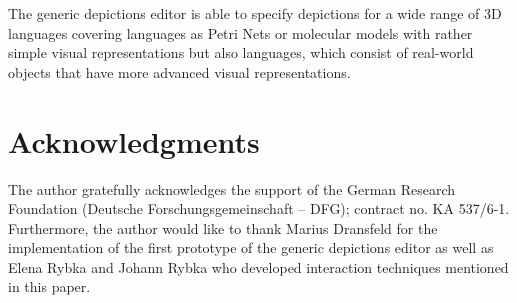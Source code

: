 \documentclass[a4paper]{article}
\begin{document}
The generic depictions editor is able to specify depictions for a wide range of 3D languages covering languages as Petri Nets or molecular models with rather simple visual representations but also languages, which consist of real-world objects that have more advanced visual representations.


\section*{Acknowledgments}
The author gratefully acknowledges the support of the German Research Foundation (Deutsche Forschungsgemeinschaft -- DFG); contract no. KA 537/6-1.
Furthermore, the author would like to thank Marius Dransfeld for the implementation of the first prototype of the generic depictions editor as well as Elena Rybka and Johann Rybka who developed interaction techniques mentioned in this paper.
\end{document}
